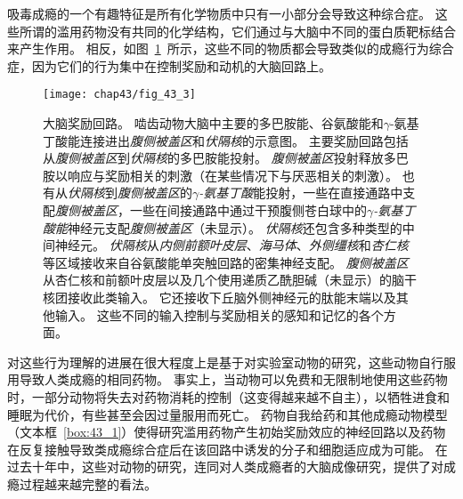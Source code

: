 吸毒成瘾的一个有趣特征是所有化学物质中只有一小部分会导致这种综合症。
这些所谓的滥用药物没有共同的化学结构，它们通过与大脑中不同的蛋白质靶标结合来产生作用。
相反，如图~\ref{fig:43_3}~所示，这些不同的物质都会导致类似的成瘾行为综合症，因为它们的行为集中在控制奖励和动机的大脑回路上。


\begin{figure}[htbp]
	\centering
	\texttt{[image: chap43/fig\_43\_3]}
	\caption{大脑奖励回路。
		啮齿动物大脑中主要的多巴胺能、谷氨酸能和$\gamma$-氨基丁酸能连接进出\textit{腹侧被盖区}和\textit{伏隔核}的示意图。
		主要奖励回路包括从\textit{腹侧被盖区}到\textit{伏隔核}的多巴胺能投射。
		\textit{腹侧被盖区}投射释放多巴胺以响应与奖励相关的刺激（在某些情况下与厌恶相关的刺激）。
		也有从\textit{伏隔核}到\textit{腹侧被盖区}的\textit{$\gamma$-氨基丁酸}能投射，一些在直接通路中支配\textit{腹侧被盖区}，一些在间接通路中通过干预腹侧苍白球中的\textit{$\gamma$-氨基丁酸能}神经元支配\textit{腹侧被盖区}（未显示）。
		\textit{伏隔核}还包含多种类型的中间神经元。
		\textit{伏隔核}从\textit{内侧前额叶皮层}、\textit{海马体}、\textit{外侧缰核}和\textit{杏仁核}等区域接收来自谷氨酸能单突触回路的密集神经支配。
		\textit{腹侧被盖区}从杏仁核和前额叶皮层以及几个使用递质乙酰胆碱（未显示）的脑干核团接收此类输入。
		它还接收下丘脑外侧神经元的肽能末端以及其他输入。
		这些不同的输入控制与奖励相关的感知和记忆的各个方面\cite{russo2013brain}。}
	\label{fig:43_3}
\end{figure}


对这些行为理解的进展在很大程度上是基于对实验室动物的研究，这些动物自行服用导致人类成瘾的相同药物。
事实上，当动物可以免费和无限制地使用这些药物时，一部分动物将失去对药物消耗的控制（这变得越来越不自主），以牺牲进食和睡眠为代价，有些甚至会因过量服用而死亡。
药物自我给药和其他成瘾动物模型（文本框~\ref{box:43_1}）使得研究滥用药物产生初始奖励效应的神经回路以及药物在反复接触导致类成瘾综合症后在该回路中诱发的分子和细胞适应成为可能。
在过去十年中，这些对动物的研究，连同对人类成瘾者的大脑成像研究，提供了对成瘾过程越来越完整的看法。


